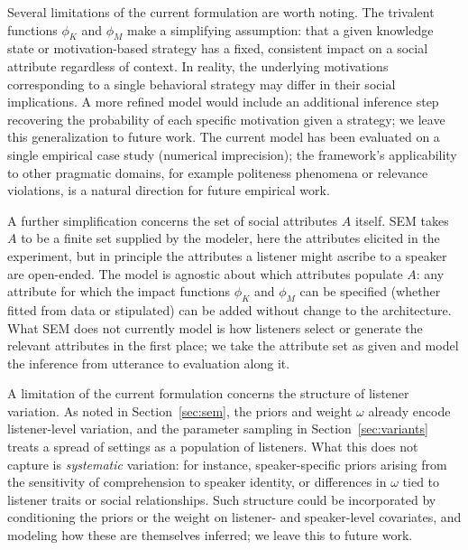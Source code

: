 \documentclass[12pt,a4paper]{article}
\begin{document}
Several limitations of the current formulation are worth noting. The trivalent
functions $\phi_K$ and $\phi_M$ make a simplifying assumption: that a given
knowledge state or motivation-based strategy has a fixed, consistent impact on a
social attribute regardless of context. In reality, the underlying motivations
corresponding to a single behavioral strategy may differ in their social
implications. A more refined model would include an additional inference step
recovering the probability of each specific motivation given a strategy; we leave
this generalization to future work. The current model has been evaluated on a
single empirical case study (numerical imprecision); the framework's
applicability to other pragmatic domains, for example politeness phenomena or
relevance violations, is a natural direction for future empirical work.

A further simplification concerns the set of social attributes $A$ itself. SEM
takes $A$ to be a finite set supplied by the modeler, here the attributes
elicited in the experiment, but in principle the attributes a listener might
ascribe to a speaker are open-ended. The model is agnostic about which attributes
populate $A$: any attribute for which the impact functions $\phi_K$ and $\phi_M$
can be specified (whether fitted from data or stipulated) can be added without
change to the architecture. What SEM does not currently model is how listeners
select or generate the relevant attributes in the first place; we take the
attribute set as given and model the inference from utterance to evaluation along
it.

A limitation of the current formulation concerns the structure of listener
variation. As noted in Section~\ref{sec:sem}, the priors and weight $\omega$
already encode listener-level variation, and the parameter sampling in
Section~\ref{sec:variants} treats a spread of settings as a population of
listeners. What this does not capture is \emph{systematic} variation: for
instance, speaker-specific priors arising from the sensitivity of comprehension
to speaker identity, or differences in $\omega$ tied to listener traits or social
relationships. Such structure could be incorporated by conditioning the priors
or the weight on listener- and speaker-level covariates, and modeling how these
are themselves inferred; we leave this to future work.
\end{document}
